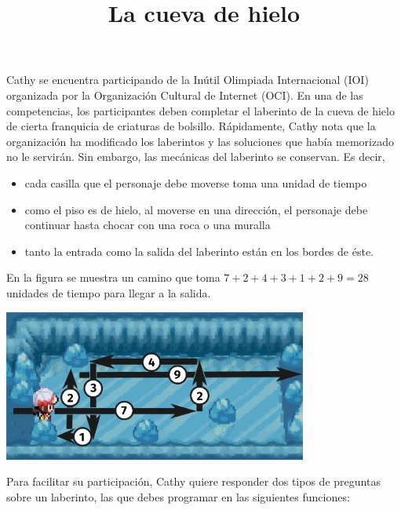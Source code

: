 \documentclass{oci}
\title{La cueva de hielo}
\begin{document}
\begin{problemDescription}
Cathy se encuentra participando de la Inútil Olimpiada Internacional (IOI)
organizada por la Organización Cultural de Internet (OCI). En una de las
competencias, los participantes deben completar el laberinto de la cueva de
hielo de cierta franquicia de criaturas de bolsillo. Rápidamente, Cathy nota que
la organización ha modificado los laberintos y las soluciones que había
memorizado no le servirán. Sin embargo, las mecánicas del laberinto se
conservan. Es decir,
\begin{itemize}
	\item cada casilla que el personaje debe moverse toma una unidad de tiempo
	\item como el piso es de hielo, al moverse en una dirección, el personaje
	debe continuar hasta chocar con una roca o una muralla
	\item tanto la entrada como la salida del laberinto están en los bordes de éste.
\end{itemize}

En la figura se muestra un camino que toma $7 + 2 + 4 + 3 + 1 + 2 + 9 = 28$
unidades de tiempo para llegar a la salida.
\begin{center}
	\includegraphics[width=0.75\textwidth]{ice2.png}
\end{center}

Para facilitar su participación, Cathy quiere responder dos tipos de preguntas
sobre un laberinto, las que debes programar en las siguientes funciones:


\end{problemDescription}
\end{document}
